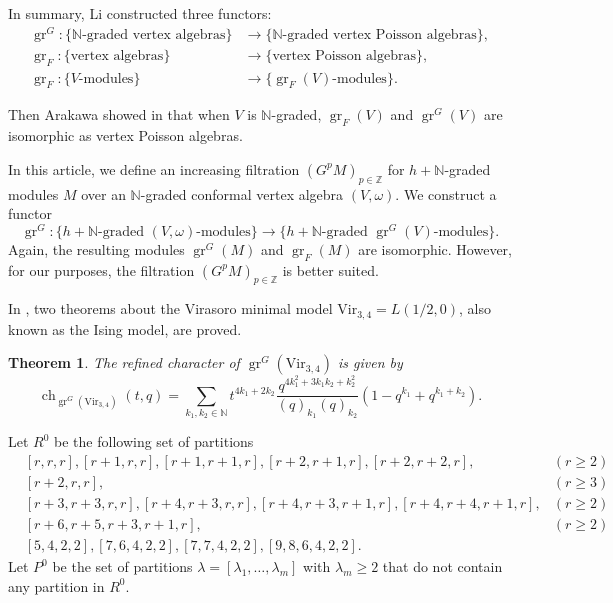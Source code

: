 \documentclass[a4paper, 12pt, reqno]{amsart}
\newtheorem{theorem}{Theorem}[section]
\theoremstyle{remark}
\DeclareMathOperator{\gr}{gr}
\DeclareMathOperator{\ch}{ch}
\newcommand{\Vir}{{\mathrm{Vir}}}
\begin{document}
In summary, Li constructed three functors:
\begin{align*}
  \gr^G: \{\text{$\mathbb{N}$-graded vertex algebras}\} &\to \{\text{$\mathbb{N}$-graded vertex Poisson algebras}\}, \\
  \gr_F: \{\text{vertex algebras}\} &\to \{\text{vertex Poisson algebras}\}, \\
  \gr_F: \{\text{$V$-modules}\} &\to \{\text{$\gr_F(V)$-modules}\}.
\end{align*}

Then Arakawa showed in \cite[Proposition 2.6.1]{arakawa_remark_2012} that when $V$ is $\mathbb{N}$-graded, $\gr_F(V)$ and $\gr^G(V)$ are isomorphic as vertex Poisson algebras.

In this article, we define an increasing filtration $(G^pM)_{p \in \mathbb{Z}}$ for $h + \mathbb{N}$-graded modules $M$ over an $\mathbb{N}$-graded conformal vertex algebra $(V, \omega)$.
We construct a functor
\begin{equation*}
  \gr^G: \{\text{$h + \mathbb{N}$-graded $(V, \omega)$-modules}\} \to \{\text{$h + \mathbb{N}$-graded $\gr^G(V)$-modules}\}.
\end{equation*}
Again, the resulting modules $\gr^G(M)$ and $\gr_F(M)$ are isomorphic.
However, for our purposes, the filtration $(G^pM)_{p \in \mathbb{Z}}$ is better suited.

In \cite{andrews_singular_2022}, two theorems about the Virasoro minimal model $\Vir_{3, 4} = L(1/2, 0)$, also known as the Ising model, are proved.

\begin{theorem}
  \label{thr:1}
  The refined character of $\gr^G(\Vir_{3,4})$ is given by
  \begin{equation*}
    \ch_{\gr^G(\Vir_{3, 4})}(t, q) = \sum_{k_1, k_2 \in \mathbb{N}}t^{4k_1 + 2k_2}\frac{q^{4k_1^2 + 3k_1k_2 + k_2^2}}{(q)_{k_1}(q)_{k_2}}(1 - q^{k_1} + q^{k_1 + k_2}).
  \end{equation*}
\end{theorem}

Let $R^0$ be the following set of partitions
\begin{align*}
  &[r, r, r], [r + 1, r, r], [r + 1, r + 1, r], [r + 2, r + 1, r], [r + 2, r + 2, r], &(r \ge 2) \\
  &[r + 2, r, r], &(r \ge 3) \\
  &[r + 3, r + 3, r, r], [r + 4, r + 3, r, r],  [r + 4, r + 3, r + 1, r], [r + 4, r + 4, r + 1, r], &(r \ge 2) \\
  &[r + 6, r + 5, r + 3, r + 1, r], &(r \ge 2) \\
  &[5, 4, 2, 2], [7, 6, 4, 2, 2], [7, 7, 4, 2, 2], [9, 8, 6, 4, 2, 2].
\end{align*}
Let $P^0$ be the set of partitions $\lambda = [\lambda_1, \dots, \lambda_m]$ with $\lambda_m \ge 2$ that do not contain any partition in $R^0$.
\end{document}

